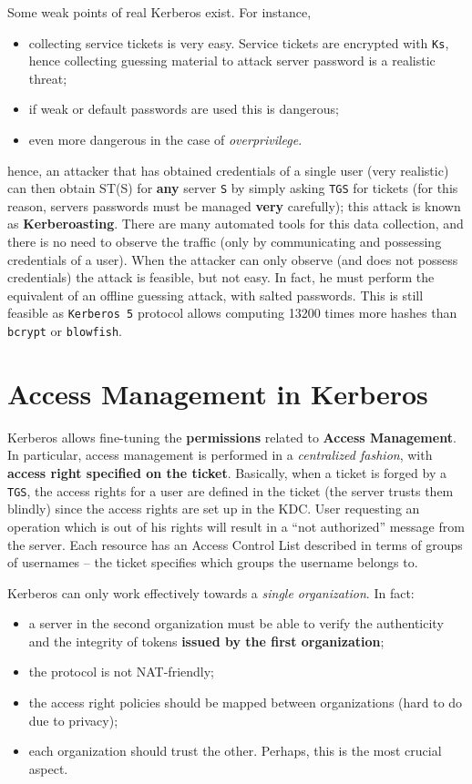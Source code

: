 \documentclass[10pt]{extreport}
\begin{document}
Some weak points of real Kerberos exist. For instance,
\begin{itemize}
    \item collecting service tickets is very easy. Service tickets are
        encrypted with \texttt{Ks}, hence collecting guessing material to
        attack server password is a realistic threat;
    \item if weak or default passwords are used this is dangerous;
    \item even more dangerous in the case of \emph{overprivilege}.
\end{itemize}
hence, an attacker that has obtained credentials of a single user (very
realistic) can then obtain ST(S) for \textbf{any} server \texttt{S} by simply
asking \texttt{TGS} for tickets (for this reason, servers passwords must be
managed \textbf{very} carefully); this attack is known as
\textbf{Kerberoasting}. There are many automated tools for this data
collection, and there is no need to observe the traffic (only by communicating
and possessing credentials of a user). When the attacker can only observe (and
does not possess credentials) the attack is feasible, but not easy. In fact, he
must perform the equivalent of an offline guessing attack, with salted
passwords. This is still feasible as \texttt{Kerberos 5} protocol allows
computing 13200 times more hashes than \texttt{bcrypt} or \texttt{blowfish}.

\section{Access Management in Kerberos}

Kerberos allows fine\--tuning the \textbf{permissions} related to
\textbf{Access Management}. In particular, access management is performed in a
\emph{centralized fashion}, with \textbf{access right specified on the ticket}.
Basically, when a ticket is forged by a \texttt{TGS}, the access rights for a
user are defined in the ticket (the server trusts them blindly) since the
access rights are set up in the KDC. User requesting an operation which is out
of his rights will result in a ``not authorized'' message from the server. Each
resource has an Access Control List described in terms of groups of usernames
-- the ticket specifies which groups the username belongs to.

Kerberos can only work effectively towards a \emph{single organization}. In fact:
\begin{itemize}
    \item a server in the second organization must be able to verify the
        authenticity and the integrity of tokens \textbf{issued by the first
        organization};
    \item the protocol is not NAT\--friendly;
    \item the access right policies should be mapped between organizations
        (hard to do due to privacy);
    \item each organization should trust the other. Perhaps, this is the most
        crucial aspect.
\end{itemize}
\end{document}
